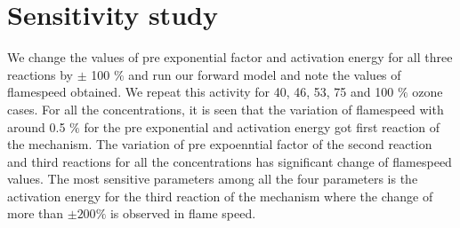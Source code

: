 \section{Sensitivity study}

  We
 change the values of pre exponential factor and activation energy for
 all three reactions by $\pm$ 100 $\% $ and run our forward model and
 note the values of flamespeed obtained. We repeat this activity for
 40, 46, 53, 75 and 100 $\%$ ozone cases. For all the concentrations,
 it is seen that the variation of flamespeed with around 0.5 $\%$ for
 the pre exponential and activation energy got first reaction of the
 mechanism. The variation of pre expoenntial factor of the second
 reaction and third reactions for all the concentrations has
 significant change of flamespeed values. The most sensitive
 parameters among all the four parameters is the activation energy for
 the third reaction of the mechanism where the change of more than
 $\pm 200\%$ is observed in flame speed.

